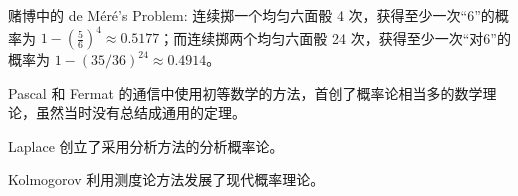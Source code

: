 \documentclass[../main.tex]{subfiles}
\begin{document}
赌博中的 de Méré's Problem: 连续掷一个均匀六面骰 4 次，获得至少一次“6”的概率为 $1-(\frac{5}{6})^4\approx0.5177$；而连续掷两个均匀六面骰 24 次，获得至少一次“对6”的概率为 $1-(35/36)^{24}\approx0.4914$。

Pascal 和 Fermat 的通信中使用初等数学的方法，首创了概率论相当多的数学理论，虽然当时没有总结成通用的定理。

Laplace 创立了采用分析方法的分析概率论。

Kolmogorov 利用测度论方法发展了现代概率理论。
\end{document}

